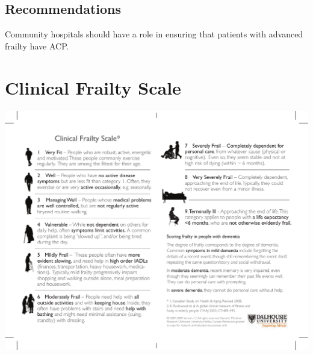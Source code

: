 \documentclass
[
	12pt,
	a4paper,
	oneside,
]{report}
\begin{document}
\section{Recommendations}
Community hospitals should have a role in ensuring that patients with 
advanced frailty have ACP.

\printbibliography[heading=bibintoc]

\clearpage

\appendix
\chapter{Clinical Frailty Scale}
\label{apx:cfs}
\includegraphics[width=\textwidth]{CFS}
\end{document}
